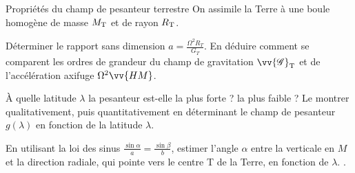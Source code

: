 \documentclass[12pt,fancy]{cours}
\begin{document}
\begin{exemple}{Propriétés du champ de pesanteur terrestre}
  On assimile la Terre à une boule homogène de masse $M_{\rm T}$ et de rayon $R_{\rm T}$.
\begin{quest}
  \item Déterminer le rapport sans dimension $a = \frac{\Omega^2 R_T}{G_T}$. En déduire comment se comparent les ordres de grandeur du champ de gravitation $\vv{\mathcal{G}}_{\rm{T}}$ et de l'accélération axifuge $\Omega^2\vv{HM}$. 
  \item À quelle latitude $\lambda$ la pesanteur est-elle la plus forte ? la plus faible ? Le montrer qualitativement, puis quantitativement en déterminant le champ de pesanteur $g(\lambda)$ en fonction de la latitude $\lambda$.
  \item En utilisant la loi des sinus $\frac{\sin \alpha}{a} = \frac{\sin \beta}{b}$, estimer l'angle $\alpha$ entre la verticale en $M$ et la direction radiale, qui pointe vers le centre T de la Terre, en fonction de $\lambda$. \AN.
\end{quest}
\end{exemple}
\end{document}
